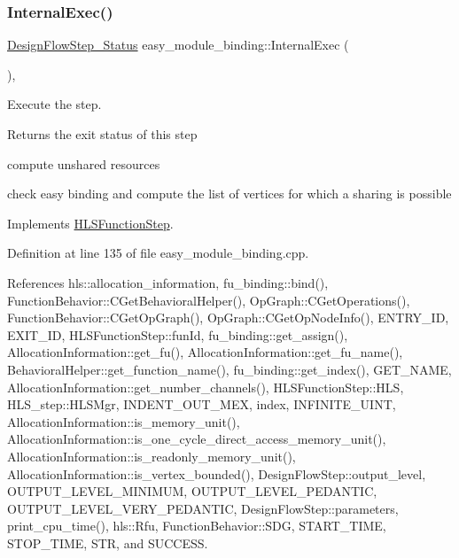 \subsubsection{\texorpdfstring{Internal\+Exec()}{InternalExec()}}
{\footnotesize\ttfamily \hyperlink{design__flow__step_8hpp_afb1f0d73069c26076b8d31dbc8ebecdf}{Design\+Flow\+Step\+\_\+\+Status} easy\+\_\+module\+\_\+binding\+::\+Internal\+Exec (\begin{DoxyParamCaption}{ }\end{DoxyParamCaption})\hspace{0.3cm}{\ttfamily [override]}, {\ttfamily [virtual]}}



Execute the step. 

\begin{DoxyReturn}{Returns}
the exit status of this step 
\end{DoxyReturn}
compute unshared resources

check easy binding and compute the list of vertices for which a sharing is possible 

Implements \hyperlink{classHLSFunctionStep_a8db4c00d080655984d98143206fc9fa8}{H\+L\+S\+Function\+Step}.



Definition at line 135 of file easy\+\_\+module\+\_\+binding.\+cpp.



References hls\+::allocation\+\_\+information, fu\+\_\+binding\+::bind(), Function\+Behavior\+::\+C\+Get\+Behavioral\+Helper(), Op\+Graph\+::\+C\+Get\+Operations(), Function\+Behavior\+::\+C\+Get\+Op\+Graph(), Op\+Graph\+::\+C\+Get\+Op\+Node\+Info(), E\+N\+T\+R\+Y\+\_\+\+ID, E\+X\+I\+T\+\_\+\+ID, H\+L\+S\+Function\+Step\+::fun\+Id, fu\+\_\+binding\+::get\+\_\+assign(), Allocation\+Information\+::get\+\_\+fu(), Allocation\+Information\+::get\+\_\+fu\+\_\+name(), Behavioral\+Helper\+::get\+\_\+function\+\_\+name(), fu\+\_\+binding\+::get\+\_\+index(), G\+E\+T\+\_\+\+N\+A\+ME, Allocation\+Information\+::get\+\_\+number\+\_\+channels(), H\+L\+S\+Function\+Step\+::\+H\+LS, H\+L\+S\+\_\+step\+::\+H\+L\+S\+Mgr, I\+N\+D\+E\+N\+T\+\_\+\+O\+U\+T\+\_\+\+M\+EX, index, I\+N\+F\+I\+N\+I\+T\+E\+\_\+\+U\+I\+NT, Allocation\+Information\+::is\+\_\+memory\+\_\+unit(), Allocation\+Information\+::is\+\_\+one\+\_\+cycle\+\_\+direct\+\_\+access\+\_\+memory\+\_\+unit(), Allocation\+Information\+::is\+\_\+readonly\+\_\+memory\+\_\+unit(), Allocation\+Information\+::is\+\_\+vertex\+\_\+bounded(), Design\+Flow\+Step\+::output\+\_\+level, O\+U\+T\+P\+U\+T\+\_\+\+L\+E\+V\+E\+L\+\_\+\+M\+I\+N\+I\+M\+UM, O\+U\+T\+P\+U\+T\+\_\+\+L\+E\+V\+E\+L\+\_\+\+P\+E\+D\+A\+N\+T\+IC, O\+U\+T\+P\+U\+T\+\_\+\+L\+E\+V\+E\+L\+\_\+\+V\+E\+R\+Y\+\_\+\+P\+E\+D\+A\+N\+T\+IC, Design\+Flow\+Step\+::parameters, print\+\_\+cpu\+\_\+time(), hls\+::\+Rfu, Function\+Behavior\+::\+S\+DG, S\+T\+A\+R\+T\+\_\+\+T\+I\+ME, S\+T\+O\+P\+\_\+\+T\+I\+ME, S\+TR, and S\+U\+C\+C\+E\+SS.

